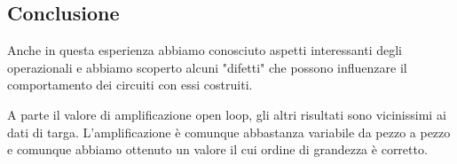 \subsection{Conclusione}

Anche in questa esperienza abbiamo conosciuto aspetti interessanti degli operazionali
e abbiamo scoperto alcuni "difetti" che possono influenzare il comportamento dei circuiti
con essi costruiti.

A parte il valore di amplificazione open loop, gli altri risultati sono vicinissimi ai dati
di targa. L'amplificazione è comunque abbastanza variabile da pezzo a pezzo e comunque
abbiamo ottenuto un valore il cui ordine di grandezza è corretto.